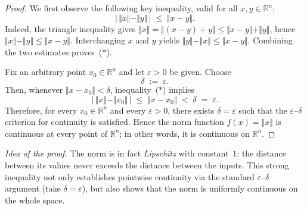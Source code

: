 \documentclass[10pt]{extarticle}
\begin{document}
\begin{proof}
    We first observe the following key inequality, valid for all $x,y\in\mathbb R^{n}$:
    \[
        \bigl|\,\Vert x\Vert-\Vert y\Vert\,\bigr|\;\le\;\Vert x-y\Vert.\tag{$\ast$}
    \]
    Indeed, the triangle inequality gives $\Vert x\Vert=\Vert(x-y)+y\Vert\le\Vert x-y\Vert+\Vert y\Vert$, hence $\Vert x\Vert-\Vert y\Vert\le\Vert x-y\Vert$.  Interchanging $x$ and $y$ yields $\Vert y\Vert-\Vert x\Vert\le\Vert x-y\Vert$.  Combining the two estimates proves~($\ast$).

    \medskip
    Fix an arbitrary point $x_{0}\in\mathbb R^{n}$ and let $\varepsilon>0$ be given.  Choose
    \[
        \delta\;:=\;\varepsilon.
    \]
    Then, whenever $\Vert x-x_{0}\Vert<\delta$, inequality~($\ast$) implies
    \[
        \bigl|\,\Vert x\Vert-\Vert x_{0}\Vert\,\bigr|\;\le\;\Vert x-x_{0}\Vert\;<\;\delta\;=\;\varepsilon.
    \]
    Therefore, for every $x_{0}\in\mathbb R^{n}$ and every $\varepsilon>0$, there exists $\delta=\varepsilon$ such that the $\varepsilon$--$\delta$ criterion for continuity is satisfied.  Hence the norm function $f(x)=\Vert x\Vert$ is continuous at every point of $\mathbb R^{n}$; in other words, it is continuous on $\mathbb R^{n}$.
\end{proof}

\begin{remark}
    \emph{Idea of the proof.}  The norm is in fact \emph{Lipschitz} with constant~$1$: the distance between its values never exceeds the distance between the inputs.  This strong inequality not only establishes pointwise continuity via the standard $\varepsilon$--$\delta$ argument (take $\delta=\varepsilon$), but also shows that the norm is uniformly continuous on the whole space.
\end{remark}
\end{document}
